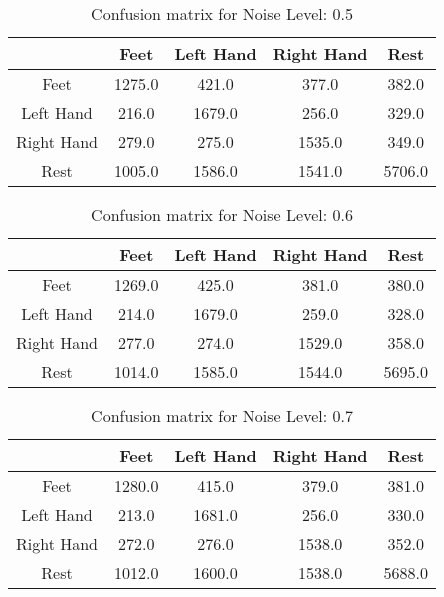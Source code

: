 \begin{table}[!htbp]
    \centering
    \begin{tabular}{|c||c|c|c|c|}
        \hline
		 & Feet & Left Hand & Right Hand & Rest \\
        \hline
        \hline
        Feet & 1275.0 & 421.0 & 377.0 & 382.0 \\
        \hline
        Left Hand & 216.0 & 1679.0 & 256.0 & 329.0 \\
        \hline
        Right Hand & 279.0 & 275.0 & 1535.0 & 349.0 \\
        \hline
        Rest & 1005.0 & 1586.0 & 1541.0 & 5706.0 \\
        \hline
    \end{tabular}
    \caption{Confusion matrix for Noise Level: 0.5}
\end{table}

\begin{table}[!htbp]
    \centering
    \begin{tabular}{|c||c|c|c|c|}
        \hline
		 & Feet & Left Hand & Right Hand & Rest \\
        \hline
        \hline
        Feet & 1269.0 & 425.0 & 381.0 & 380.0 \\
        \hline
        Left Hand & 214.0 & 1679.0 & 259.0 & 328.0 \\
        \hline
        Right Hand & 277.0 & 274.0 & 1529.0 & 358.0 \\
        \hline
        Rest & 1014.0 & 1585.0 & 1544.0 & 5695.0 \\
        \hline
    \end{tabular}
    \caption{Confusion matrix for Noise Level: 0.6}
\end{table}

\begin{table}[!htbp]
    \centering
    \begin{tabular}{|c||c|c|c|c|}
        \hline
		 & Feet & Left Hand & Right Hand & Rest \\
        \hline
        \hline
        Feet & 1280.0 & 415.0 & 379.0 & 381.0 \\
        \hline
        Left Hand & 213.0 & 1681.0 & 256.0 & 330.0 \\
        \hline
        Right Hand & 272.0 & 276.0 & 1538.0 & 352.0 \\
        \hline
        Rest & 1012.0 & 1600.0 & 1538.0 & 5688.0 \\
        \hline
    \end{tabular}
    \caption{Confusion matrix for Noise Level: 0.7}
\end{table}

